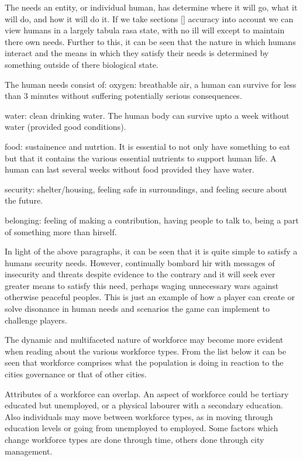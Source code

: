 The needs an entity, or individual human, has determine where it will go, what it will do, and how it will do it. If we take sections [] accuracy into account we can view humans in a largely tabula rasa state, with no ill will except to maintain there own needs. Further to this, it can be seen that the nature in which humans interact and the means in which they satisfy their needs is determined by something outside of there biological state. 

The human needs consist of:
oxygen: breathable air, a human can survive for less than 3 minutes without suffering potentially serious consequences. 

water: clean drinking water. The human body can survive upto a week without water (provided good conditions). 

food: sustainence and nutrtion. It is essential to not only have something to eat but that it contains the various essential nutrients to support human life. A human can last several weeks without food provided they have water.

security: shelter/housing, feeling safe in surroundings, and feeling secure about the future.

belonging: feeling of making a contribution, having people to talk to, being a part of something more than hirself.

In light of the above paragraphs, it can be seen that it is quite simple to satisfy a humans security needs. However, continually bombard hir with messages of insecurity and threats despite evidence to the contrary and it will seek ever greater means to satisfy this need, perhaps waging unnecessary wars against otherwise peaceful peoples. This is just an example of how a player can create or solve disonance in human needs and scenarios the game can implement to challenge players.



The dynamic and multifaceted nature of workforce may become more evident when reading about the various workforce types. From the list below it can be seen that workforce comprises what the population is doing in reaction to the cities governance or that of other cities.

Attributes of a workforce can overlap. An aspect of workforce could be tertiary educated but unemployed, or a physical labourer with a secondary education. Also individuals may move between workforce types, as in moving through education levels or going from unemployed to employed. Some factors which change workforce types are done through time, others done through city management.

